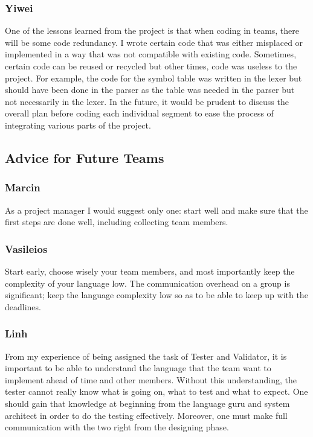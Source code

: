 \subsubsection{Yiwei}

One of the lessons learned from the project is that when coding in teams,
there will be some code redundancy. I wrote certain code that was either
misplaced or implemented in a way that was not compatible with existing
code. Sometimes, certain code can be reused or recycled but other times,
code was useless to the project. For example, the code for the symbol table
was written in the lexer but should have been done in the parser as the
table was needed in the parser but not necessarily in the lexer. In the
future, it would be prudent to discuss the overall plan before coding each 
individual segment to ease the process of integrating various parts of the 
project. 

\subsection{Advice for Future Teams}

\subsubsection{Marcin}

As a project manager I would suggest only one: start well 
and make sure that the first steps are done well, including collecting team
members.

\subsubsection{Vasileios}

Start early, choose wisely your team members, and most importantly keep the
complexity of your language low. The communication overhead on a group is
significant; keep the language complexity low so as to be able to keep up
with the deadlines.

\subsubsection{Linh}

From my experience of being assigned the task of Tester and 
Validator, it is important to be able to understand the language that the
team want to implement ahead of time and other members. Without this
understanding, the tester cannot really know what is going on, what to
test and what to expect. One should gain that knowledge at beginning from
the language guru and system architect in order to do the testing
effectively. Moreover, one must make full communication with the two right 
from the designing phase.

